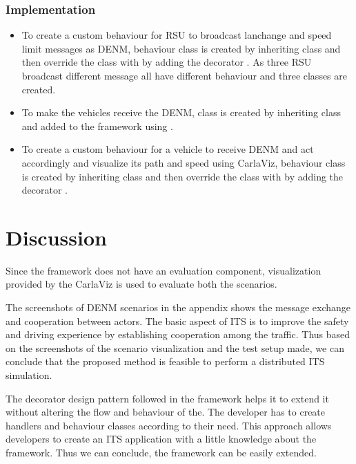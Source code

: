\subsubsection{Implementation}
\begin{itemize}
    \item To create a custom behaviour for RSU to broadcast lanchange and speed limit messages as DENM,  behaviour class is created by inheriting  class and then override the  class with  by adding the decorator . As three RSU broadcast different message all have different behaviour and three classes are created.

    \item To make the vehicles receive the DENM,  class is created by inheriting  class and added to the framework using .

    \item To create a custom behaviour for a vehicle to receive DENM and act accordingly and visualize its path and speed using CarlaViz,  behaviour class is created by inheriting  class and then override the  class with  by adding the decorator .

\end{itemize}

\section{Discussion}
Since the framework does not have an evaluation component, visualization provided by the CarlaViz is used to evaluate both the scenarios.  

The screenshots of  DENM scenarios in the appendix shows the message exchange and cooperation between actors. The basic aspect of  ITS  is to improve the safety and driving experience by establishing cooperation among the traffic. Thus based on the screenshots of the scenario visualization and the test setup made, we can conclude that the proposed method is feasible to perform a distributed ITS simulation. 

The decorator design pattern followed in the framework helps it to extend it without altering the flow and behaviour of the. The developer has to create handlers and behaviour classes according to their need. This approach allows developers to create an ITS application with a little knowledge about the framework. Thus we can conclude, the framework can be easily extended.
